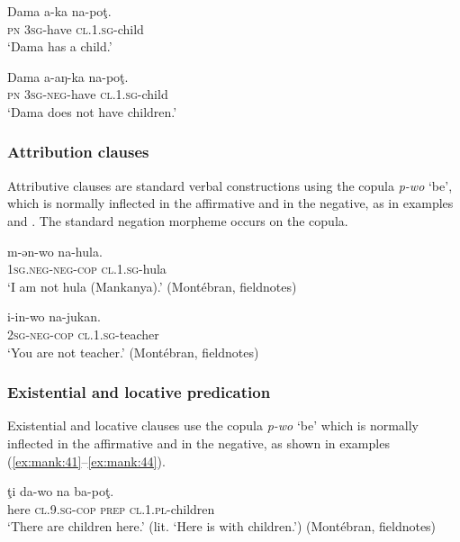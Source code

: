 \documentclass[output=paper,colorlinks,citecolor=brown]{langscibook}
\begin{document}
\ea\label{ex:mank:37}
    \gll Dama a-ka na-poţ. \\
         \textsc{pn} \textsc{3sg}-have \textsc{cl.1.sg}-child\\
    \glt ‘Dama has a child.’ \citep[125]{Gaved2020}
\z

\ea\label{ex:mank:38}
    \gll Dama a-aŋ-ka na-poţ. \\
         \textsc{pn} \textsc{3sg{}-neg}-have \textsc{cl.1.sg}-child \\
    \glt ‘Dama does not have children.’ \citep[125]{Gaved2020}
\z

\subsubsection{Attribution clauses}\label{sec:mank:2.3.2}

Attributive clauses are standard verbal constructions using the copula \textit{p-wo} ‘be’, which is normally inflected in the affirmative and in the negative, as in examples  and . The standard negation morpheme occurs on the copula.

\ea\label{ex:mank:39}
    \gll m-ən-wo na-hula.\\
         \textsc{1sg.neg-neg-cop} \textsc{cl.1.sg}-hula \\
    \glt ‘I am not hula (Mankanya).’ (Montébran, fieldnotes)
\z

\ea\label{ex:mank:40}
    \gll i-in-wo na-jukan. \\
         \textsc{2sg{}-neg{}-cop} \textsc{cl.1.sg}-teacher \\
    \glt ‘You are not teacher.’ (Montébran, fieldnotes)
\z

\subsubsection{Existential and locative predication}\label{sec:mank:2.3.3}

Existential and locative clauses use the copula \textit{p-wo} ‘be’ which is normally inflected in the affirmative and in the negative, as shown in examples (\ref{ex:mank:41}--\ref{ex:mank:44}). 
    
\ea\label{ex:mank:41}
    \gll ţi da-wo na ba-poţ. \\
         here \textsc{cl.9.sg}\textsc{-cop} \textsc{prep} \textsc{cl.1.pl}-children \\
    \glt ‘There are children here.’ (lit. ‘Here is with children.’) (Montébran, fieldnotes)
\z
\end{document}
